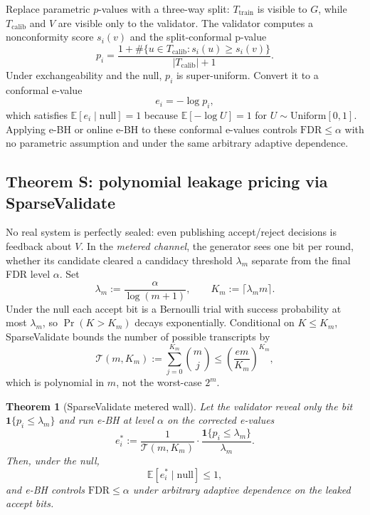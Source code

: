 \documentclass[sigconf]{acmart}
\theoremstyle{plain}
\newtheorem{theorem}{Theorem}[section]
\begin{document}
Replace parametric $p$-values with a three-way split: $T_{\text{train}}$ is
visible to $G$, while $T_{\text{calib}}$ and $V$ are visible only to the
validator. The validator computes a nonconformity score $s_i(v)$ and the
split-conformal p-value
\begin{equation}
p_i = \frac{1 + \#\{u\in T_{\text{calib}} : s_i(u)\ge s_i(v)\}}
            {|T_{\text{calib}}|+1}.
\end{equation}
Under exchangeability and the null, $p_i$ is super-uniform. Convert it to a
conformal e-value
\begin{equation}\label{eq:conf-e}
e_i = -\log p_i,
\end{equation}
which satisfies $\mathbb{E}[e_i\mid\text{null}]=1$ because
$\mathbb{E}[-\log U]=1$ for $U\sim\text{Uniform}[0,1]$. Applying e-BH or
online e-BH to these conformal e-values controls $\mathrm{FDR}\le\alpha$ with
no parametric assumption and under the same arbitrary adaptive dependence.

\subsection{Theorem S: polynomial leakage pricing via SparseValidate}\label{sec:theorem-s}

No real system is perfectly sealed: even publishing accept/reject decisions is
feedback about $V$. In the \emph{metered channel}, the generator sees one bit
per round, whether its candidate cleared a candidacy threshold $\lambda_m$
separate from the final FDR level $\alpha$. Set
\begin{equation}
\lambda_m := \frac{\alpha}{\log(m+1)},\qquad
K_m := \lceil \lambda_m m \rceil.
\end{equation}
Under the null each accept bit is a Bernoulli trial with success probability
at most $\lambda_m$, so $\Pr(K>K_m)$ decays exponentially. Conditional on
$K\le K_m$, SparseValidate bounds the number of possible transcripts by
\begin{equation}
\mathcal{T}(m,K_m) := \sum_{j=0}^{K_m} \binom{m}{j}
\le \left(\frac{e m}{K_m}\right)^{K_m},
\end{equation}
which is polynomial in $m$, not the worst-case $2^m$.

\begin{theorem}[SparseValidate metered wall]\label{thm:s}
Let the validator reveal only the bit $\mathbf{1}\{p_i\le\lambda_m\}$ and run
 e-BH at level $\alpha$ on the corrected e-values
\begin{equation}
e_i^* := \frac{1}{\mathcal{T}(m,K_m)} \cdot
          \frac{\mathbf{1}\{p_i\le\lambda_m\}}{\lambda_m}.
\end{equation}
Then, under the null,
\begin{equation}
\mathbb{E}\left[ e_i^* \mid \text{null} \right] \le 1,
\end{equation}
and e-BH controls $\mathrm{FDR}\le\alpha$ under arbitrary adaptive
dependence on the leaked accept bits.
\end{theorem}
\end{document}
